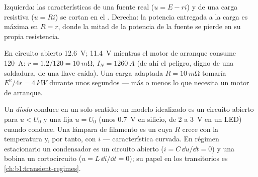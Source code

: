 \begin{omfigure}
\qquad
{}

{\small Izquierda: las características de una fuente real ($u = E - ri$) y
de una carga resistiva ($u = Ri$) se cortan en el .
Derecha: la potencia entregada a la carga es máxima en $R = r$, donde la
mitad de la potencia de la fuente se pierde en su propia resistencia.}
\end{omfigure}

\begin{example}\label{ex:b1:dc-circuits:battery}
En circuito abierto \qty{12.6}{V}; \qty{11.4}{V} mientras el motor de
arranque consume \qty{120}{A}: $r = 1.2/120 = \qty{10}{m\ohm}$,
$I_N = \qty{1260}{A}$ (de ahí el peligro, digno de una soldadura, de una
llave caída). Una carga adaptada $R = \qty{10}{m\ohm}$ tomaría
$E^2/4r = \qty{4}{kW}$ durante unos segundos --- más o menos lo que
necesita un motor de arranque.
\end{example}

\begin{remark}\label{rem:b1:dc-circuits:others}
Un \emph{diodo} conduce en un solo sentido: un modelo idealizado es un
circuito abierto para $u < U_0$ y una  fija $u = U_0$ (unos
\qty{0.7}{V} en silicio, de \qty{2}{} a \qty{3}{V} en un LED) cuando
conduce. Una lámpara de filamento es un  cuya $R$ crece con la
temperatura y, por tanto, con $i$ --- característica curvada. En régimen
estacionario un condensador es un circuito abierto ($i = C\,\dd u/\dd t = 0$)
y una bobina un cortocircuito ($u = L\,\dd i/\dd t = 0$); su papel en los
transitorios es \cref{ch:b1:transient-regimes}.
\end{remark}


